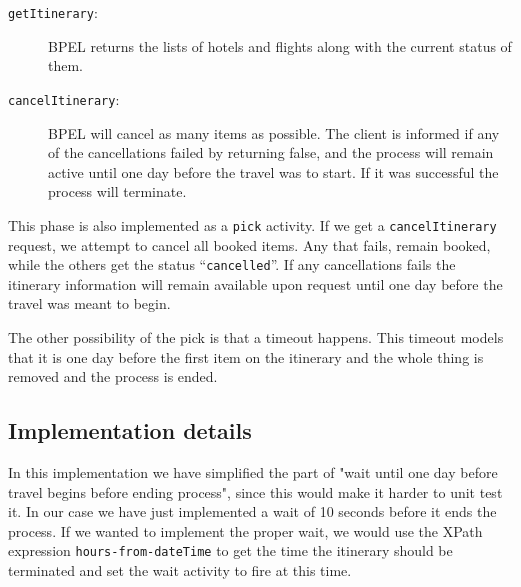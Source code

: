 \begin{description}
\item [\texttt{getItinerary}:] BPEL returns the lists of hotels and flights along with the current status of them.
\item [\texttt{cancelItinerary}:] BPEL will cancel as many items as possible. The client is informed if any of the cancellations failed by returning false, and the process will remain active until one day before the travel was to start. If it was successful the process will terminate.
\end{description}

This phase is also implemented as a \texttt{pick} activity. If we get a \texttt{cancelItinerary} request, we attempt to cancel all booked items. Any that fails, remain booked, while the others get the status ``\texttt{cancelled}''. If any cancellations fails the itinerary information will remain available upon request until one day before the travel was meant to begin. 

The other possibility of the pick is that a timeout happens. This timeout models that it is one day before the first item on the itinerary and the whole thing is removed and the process is ended.


\subsection{Implementation details}

In this implementation we have simplified the part of "wait until one day before travel begins before ending process", since this would make it harder to unit test it. In our case we have just implemented a wait of 10 seconds before it ends the process. If we wanted to implement the proper wait, we would use the XPath expression \texttt{hours-from-dateTime} to get the time the itinerary should be terminated and set the wait activity to fire at this time.